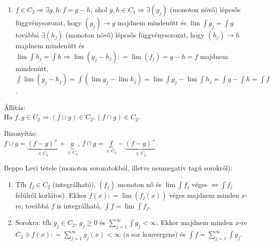 \documentclass[12pt,a4paper]{scrartcl}
\providecommand{\tightlist}{%
  \setlength{\itemsep}{0pt}\setlength{\parskip}{0pt}}
\newenvironment{tetel}{}{}
\newenvironment{bizonyitas}{}{}
\newenvironment{allitas}{}{}
\begin{document}
\begin{bizonyitas}
\begin{enumerate}
\item
  \(\left. f \in C_{2}\Rightarrow\exists g,h:f = g - h \right.\), ahol
  \(\left. g,h \in C_{1}\Rightarrow\exists\left( g_{j} \right) \right.\)
  (monoton növő) lépcsős függvénysorozat, hogy
  \(\left. \left( g_{j} \right)\rightarrow g \right.\) majdnem mindenütt
  és \(\lim{\int g_{j}} = {\int g}\) továbbá
  \(\exists\left( h_{j} \right)\) (monoton növő) lépcsős
  függvénysorozat, hogy
  \(\left. \left( h_{j} \right)\rightarrow h \right.\) majdnem mindenütt
  és
  \(\left. \lim{\int h_{j}} = {\int h}\Rightarrow\lim\left( {g_{j} - h_{j}} \right): = \lim\left( f_{j} \right) = g - h = f \right.\)
  majdnem mindenütt,
  \({\int{\lim\left( {g_{j} - h_{j}} \right)}} = {\int\left( {\lim g_{j} - \lim h_{j}} \right)} = \lim{\int g_{j}} - \lim{\int h_{j}} = {\int g} - {\int h} = {\int f}\).
\end{enumerate}

\end{bizonyitas}

\begin{allitas}

Állítás:\\
Ha
\(\left. f,g \in C_{2}\Rightarrow\left( {f \cup g} \right) \in C_{2},\left( {f \cap g} \right) \in C_{2} \right.\).

\end{allitas}

\begin{bizonyitas}

Bizonyítás:\\
\(f \cup g = \underbrace {{{\left( {f - g} \right)}^ + }}_{ \in {C_2}} + \underbrace g_{ \in {C_2}}\),
\(f \cap g = \underbrace f_{ \in {C_2}} - \underbrace {{{\left( {f - g} \right)}^ + }}_{ \in {C_2}}\).

\end{bizonyitas}

\begin{tetel}

Beppo Levi tétele (monoton sorozatokból, illetve nemnegatív tagú
sorokról):

\begin{enumerate}
\def\labelenumi{\arabic{enumi}.}
\tightlist
\item
  Tfh \(f_{j} \in C_{2}\) (integrálható), \(\left( f_{j} \right)\)
  monoton nő és \(\lim{\int f_{j}}\) véges
  \(\left. \Leftrightarrow{\int f_{j}} \right.\) felülről korlátos).
  Ekkor
  \(f\left( x \right): = \lim\left( {f_{j}\left( x \right)} \right)\)
  véges majdnem minden \(x\)-re, továbbá \(f\) is integrálható,
  \({\int f} = \lim{\int f_{j}}\).
\item
  Sorokra: tfh \(g_{j} \in C_{2}\), \(g_{j} \geq 0\) és
  \({\sum\limits_{j = 1}^{\infty}{\int g_{j}}} < \infty\). Ekkor majdnem
  minden \(x\)-re
  \(C_{2} \ni f\left( x \right): = {\sum\limits_{j = 1}^{\infty}{g_{j}\left( x \right)}} < \infty\)
  (a sor konvergens) és
  \({\int f} = {\sum\limits_{j = 1}^{\infty}{\int g_{j}}}\).
\end{enumerate}

\end{tetel}
\end{document}
